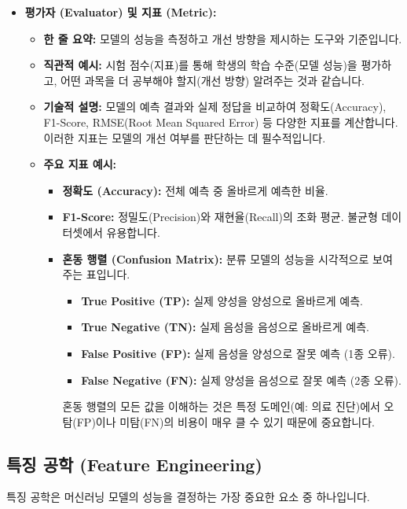 \documentclass[11pt,a4paper]{article}
\begin{document}
\begin{itemize}
\begin{itemize}
    \end{itemize}
    \item \textbf{평가자 (Evaluator) 및 지표 (Metric):}
    \begin{itemize}
        \item \textbf{한 줄 요약:} 모델의 성능을 측정하고 개선 방향을 제시하는 도구와 기준입니다.
        \item \textbf{직관적 예시:} 시험 점수(지표)를 통해 학생의 학습 수준(모델 성능)을 평가하고, 어떤 과목을 더 공부해야 할지(개선 방향) 알려주는 것과 같습니다.
        \item \textbf{기술적 설명:} 모델의 예측 결과와 실제 정답을 비교하여 정확도(Accuracy), F1-Score, RMSE(Root Mean Squared Error) 등 다양한 지표를 계산합니다. 이러한 지표는 모델의 개선 여부를 판단하는 데 필수적입니다.
        \item \textbf{주요 지표 예시:}
        \begin{itemize}
            \item \textbf{정확도 (Accuracy):} 전체 예측 중 올바르게 예측한 비율.
            \item \textbf{F1-Score:} 정밀도(Precision)와 재현율(Recall)의 조화 평균. 불균형 데이터셋에서 유용합니다.
            \item \textbf{혼동 행렬 (Confusion Matrix):} 분류 모델의 성능을 시각적으로 보여주는 표입니다.
            \begin{itemize}
                \item \textbf{True Positive (TP):} 실제 양성을 양성으로 올바르게 예측.
                \item \textbf{True Negative (TN):} 실제 음성을 음성으로 올바르게 예측.
                \item \textbf{False Positive (FP):} 실제 음성을 양성으로 잘못 예측 (1종 오류).
                \item \textbf{False Negative (FN):} 실제 양성을 음성으로 잘못 예측 (2종 오류).
            \end{itemize}
            혼동 행렬의 모든 값을 이해하는 것은 특정 도메인(예: 의료 진단)에서 오탐(FP)이나 미탐(FN)의 비용이 매우 클 수 있기 때문에 중요합니다.
        \end{itemize}
    \end{itemize}
\end{itemize}

\subsection*{특징 공학 (Feature Engineering)}
특징 공학은 머신러닝 모델의 성능을 결정하는 가장 중요한 요소 중 하나입니다.
\end{document}
